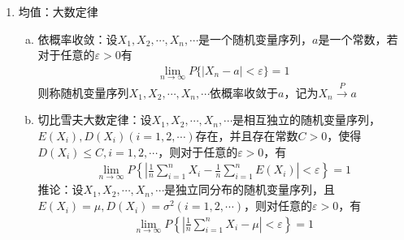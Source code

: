 \documentclass[12pt]{book}
\begin{document}
\begin{enumerate}[1.]
\begin{enumerate}[(1)]
              \item 均值：大数定律
                    \begin{enumerate}[a.]
                        \item 依概率收敛：设$X_1,X_2,\cdots,X_n,\cdots$是一个随机变量序列，$a$是一个常数，若对于任意的$\varepsilon>0$有
                              \begin{gather*}
                                  \lim\limits_{n\rightarrow\infty}{P\{|X_n-a|<\varepsilon\}}=1
                              \end{gather*}
                              则称随机变量序列$X_1,X_2,\cdots,X_n,\cdots$依概率收敛于$a$，记为$X_{n}\xrightarrow{P}a$
                        \item 切比雪夫大数定律：设$X_1,X_2,\cdots,X_n,\cdots$是相互独立的随机变量序列，$E(X_i), D(X_i) (i=1,2,\cdots)$存在，并且存在常数$C>0$，使得$D(X_i)\leqslant C, i=1,2,\cdots$，则对于任意的$\varepsilon>0$，有
                              \begin{gather*}
                                  \lim\limits_{n\rightarrow\infty}{P\left\{\left|\frac{1}{n}\sum_{i=1}^{n}X_i-\frac{1}{n}\sum_{i=1}^{n}E\left(X_i\right)\right|<\varepsilon\right\}}=1
                              \end{gather*}
                              推论：设$X_1,X_2,\cdots,X_n,\cdots$是独立同分布的随机变量序列，且$E(X_i)=\mu, D(X_i)=\sigma^2 (i=1,2,\cdots)$，则对任意的$\varepsilon>0$，有
                              \begin{gather*}
                                  \lim\limits_{n\rightarrow\infty}{P\left\{\left|\frac{1}{n}\sum_{i=1}^{n}X_i-\mu\right|<\varepsilon\right\}}=1
                              \end{gather*}
\end{enumerate}
\end{enumerate}
\end{enumerate}
\end{document}

